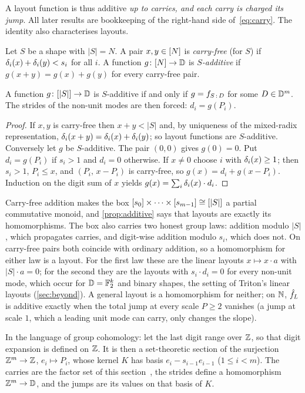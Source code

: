 A layout function is thus additive \emph{up to carries, and each carry is charged its jump}. All
later results are bookkeeping of the right-hand side of~\eqref{eq:carry}. The identity also
characterises layouts.

\begin{definition}\label{def:additive}
Let $S$ be a shape with $|S|=N$. A pair $x,y\in[N]$ is \emph{carry-free} (for $S$) if
$\delta_i(x)+\delta_i(y)<s_i$ for all $i$. A function $g\colon[N]\to\mathbb{D}$ is \emph{$S$-additive} if
$g(x+y)=g(x)+g(y)$ for every carry-free pair.
\end{definition}

\begin{proposition}\label{prop:additive}
A function $g\colon[|S|]\to\mathbb{D}$ is $S$-additive if and only if $g=f_{S\,{:}\,D}$ for some
$D\in\mathbb{D}^m$. The strides of the non-unit modes are then forced: $d_i=g(P_i)$.
\end{proposition}
\begin{proof}
If $x,y$ is carry-free then $x+y<|S|$ and, by uniqueness of the mixed-radix representation,
$\delta_i(x+y)=\delta_i(x)+\delta_i(y)$; so layout functions are $S$-additive. Conversely let $g$ be
$S$-additive. The pair $(0,0)$ gives $g(0)=0$. Put $d_i=g(P_i)$ if $s_i>1$ and $d_i=0$ otherwise.
If $x\neq0$ choose $i$ with $\delta_i(x)\ge1$; then $s_i>1$, $P_i\le x$, and $(P_i,\,x-P_i)$ is
carry-free, so $g(x)=d_i+g(x-P_i)$. Induction on the digit sum of $x$ yields
$g(x)=\sum_i\delta_i(x)\cdot d_i$.
\end{proof}

\begin{remark}\label{rem:twogroups}
Carry-free addition makes the box $[s_0]\times\dots\times[s_{m-1}]\cong[|S|]$ a
partial commutative monoid, and \cref{prop:additive} says that layouts are exactly its
homomorphisms. The box also carries two honest group laws: addition modulo $|S|$, which propagates
carries, and digit-wise addition modulo $s_i$, which does not. On carry-free pairs both coincide
with ordinary addition, so a homomorphism for either law is a layout. For the first law these are
the linear layouts $x\mapsto x\cdot a$ with $|S|\cdot a=0$; for the second they are the layouts
with $s_i\cdot d_i=0$ for every non-unit mode, which occur for $\mathbb{D}=\mathbb{F}_2^k$ and binary shapes, the
setting of Triton's linear layouts (\cref{sec:beyond}). A general layout is a homomorphism for
neither; on $\mathbb{N}$, $\hat{f}_{L}$ is additive exactly when the total jump at every scale $P\ge2$
vanishes (a jump at scale $1$, which a leading unit mode can carry, only changes the slope).

In the language of group cohomology: let the last digit range over $\mathbb{Z}$, so that digit expansion
is defined on $\mathbb{Z}$. It is then a set-theoretic section of the surjection $\mathbb{Z}^m\to\mathbb{Z}$,
$e_i\mapsto P_i$, whose kernel $K$ has basis $e_i-s_{i-1}e_{i-1}$ ($1\le i<m$). The carries are the
factor set of this section~\cite{isaksen2002}, the strides define a homomorphism $\mathbb{Z}^m\to\mathbb{D}$, and
the jumps are its values on that basis of $K$.
\end{remark}
